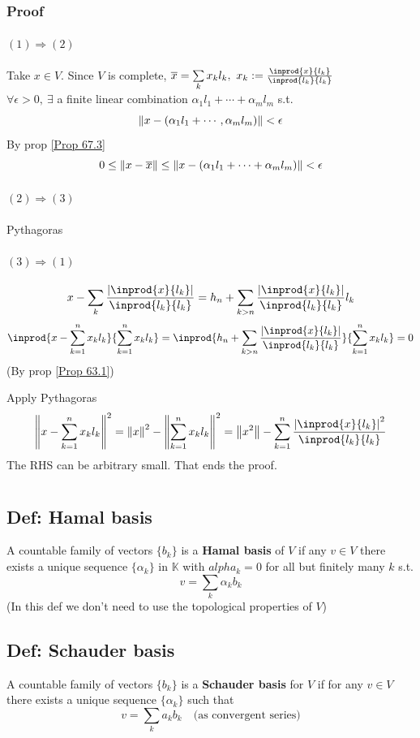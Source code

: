 \documentclass{book}
\newcommand{\abs}[1]{\left\lvert #1 \right\rvert}
\begin{document}
\subsection*{Proof}
\subsubsection{$(1)\Rightarrow(2)$}Take $x\in V$. Since $V$ is complete, $\overline{x}=\sum\limits_kx_kl_k,\ x_k:=\frac{\inprod{x}{l_k}}{\inprod{l_k}{l_k}}$\\
$\forall\epsilon>0,\ \exists$ a finite linear combination $\alpha_1l_1+\cdots+\alpha_ml_m$ s.t.$$\left\lVert x-(\alpha_1l_1+\cdots,\alpha_ml_m) \right\rVert<\epsilon$$
By prop \ref{Prop 67.3}$$0\leq\left\lVert x-\overline{x} \right\rVert\leq\left\lVert x-(\alpha_1l_1+\cdots+\alpha_ml_m) \right\rVert<\epsilon$$
\subsubsection{$(2)\Rightarrow(3)$}Pythagoras
\subsubsection{$(3)\Rightarrow(1)$}
$$x-\sum\limits_k\frac{\abs{\inprod{x}{l_k}}}{\inprod{l_k}{l_k}}=h_n+\sum\limits_{k>n}\frac{\abs{\inprod{x}{l_k}}}{\inprod{l_k}{l_k}}l_k$$
$$\inprod{x-\sum\limits_{k=1}^nx_kl_k}{\sum\limits_{k=1}^nx_kl_k}=\inprod{h_n+\sum\limits_{k>n}\frac{\abs{\inprod{x}{l_k}}}{\inprod{l_k}{l_k}}}{\sum\limits_{k=1}^nx_kl_k}=0$$
(By prop \ref{Prop 63.1})

Apply Pythagoras
$$\norm{x-\sum\limits_{k=1}^nx_kl_k}^2=\norm{x}^2-\norm{\sum\limits_{k=1}^nx_kl_k}^2=\norm{x^2}-\sum\limits_{k=1}^n\frac{\abs{\inprod{x}{l_k}}^2}{\inprod{l_k}{l_k}}$$
The RHS can be arbitrary small. That ends the proof.

\chapter{}
\section{Def: Hamal basis}A countable family of vectors $\{b_k\}$ is a \textbf{Hamal basis} of $V$ if any $v\in V$ there exists a unique sequence $\{\alpha_k\}$ in $\mathbb{K}$ with $alpha_k=0$ for all but finitely many $k$ s.t. $$v=\sum\limits_k\alpha_kb_k$$
(In this def we don't need to use the topological properties of $V$)
\section{Def: Schauder basis}A countable family of vectors $\{b_k\}$ is a \textbf{Schauder basis} for $V$ if for any $v\in V$ there exists a unique sequence $\{\alpha_k\}$ such that$$v=\sum\limits_k a_kb_k\quad \text{(as convergent series)}$$
\end{document}
